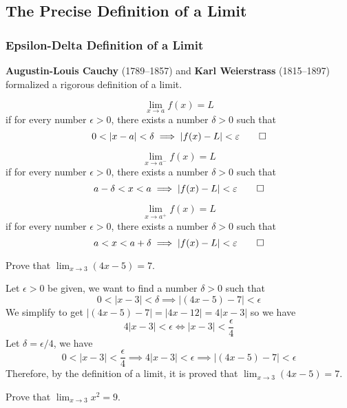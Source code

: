 \subsection{The Precise Definition of a Limit}

\subsubsection{Epsilon-Delta Definition of a Limit}
\textbf{Augustin-Louis Cauchy} (1789--1857) and \textbf{Karl Weierstrass}
(1815--1897) formalized a rigorous definition of a limit.
\begin{definition}
    \[\lim_{x\to a}f(x)=L\] if for every number \(\epsilon>0\), there exists a
    number \(\delta>0\) such that
    \[0<|x-a|<\delta \implies |f(x)-L|<\epsilon \qedhere\]
\end{definition}
\begin{definition}
    \[\lim_{x\to a^-}f(x)=L\] if for every number \(\epsilon>0\), there exists
    a number \(\delta>0\) such that
    \[a-\delta<x<a \implies |f(x)-L|<\epsilon \qedhere\]
\end{definition}
\begin{definition}
    \[\lim_{x\to a^+}f(x)=L\] if for every number \(\epsilon>0\), there exists
    a number \(\delta>0\) such that
    \[a<x<a+\delta \implies |f(x)-L|<\epsilon \qedhere\]
\end{definition}
\begin{problem}
    Prove that \(\displaystyle{\lim_{x\to 3}(4x-5)=7}\).
\end{problem}
\begin{solution}
    Let \(\epsilon>0\) be given, we want to find a number \(\delta>0\) such
    that \[0<|x-3|<\delta \implies|(4x-5)-7|<\epsilon\]
    We simplify to get \(|(4x-5)-7|=|4x-12|=4|x-3|\) so we have
    \[4|x-3|<\epsilon \iff |x-3|<\frac{\epsilon}{4}\]
    Let \(\delta=\epsilon/4\), we have
    \[0<|x-3|<\frac{\epsilon}{4} \implies4|x-3|<\epsilon \implies
    |(4x-5)-7|<\epsilon\]
    Therefore, by the definition of a limit, it is proved that
    \(\displaystyle{\lim_{x\to 3}(4x-5)=7}\).
\end{solution}
\begin{problem}
    Prove that \(\displaystyle{\lim_{x\to 3}x^2=9}\).
\end{problem}
